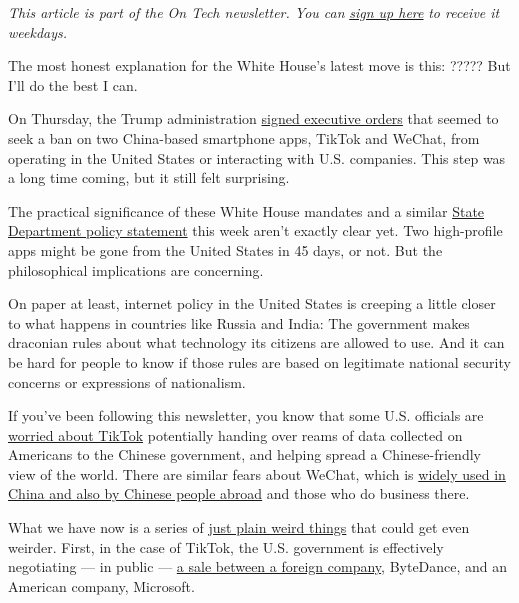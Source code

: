 \emph{This article is part of the On Tech newsletter. You can}
\href{https://www.nytimes.com/newsletters/signup/OT}{\emph{sign up
here}} \emph{to receive it weekdays.}

The most honest explanation for the White House's latest move is this:
????? But I'll do the best I can.

On Thursday, the Trump administration
\href{https://www.nytimes.com/2020/08/06/technology/trump-wechat-tiktok-china.html}{signed
executive orders} that seemed to seek a ban on two China-based
smartphone apps, TikTok and WeChat, from operating in the United States
or interacting with U.S. companies. This step was a long time coming,
but it still felt surprising.

The practical significance of these White House mandates and a similar
\href{https://www.state.gov/announcing-the-expansion-of-the-clean-network-to-safeguard-americas-assets/}{State
Department policy statement} this week aren't exactly clear yet. Two
high-profile apps might be gone from the United States in 45 days, or
not. But the philosophical implications are concerning.

On paper at least, internet policy in the United States is creeping a
little closer to what happens in countries like Russia and India: The
government makes draconian rules about what technology its citizens are
allowed to use. And it can be hard for people to know if those rules are
based on legitimate national security concerns or expressions of
nationalism.

If you've been following this newsletter, you know that some U.S.
officials are
\href{https://www.nytimes.com/2020/07/26/technology/tiktok-china-ban-model.html}{worried
about TikTok} potentially handing over reams of data collected on
Americans to the Chinese government, and helping spread a
Chinese-friendly view of the world. There are similar fears about
WeChat, which is
\href{https://www.nytimes.com/2020/08/07/business/trump-china-wechat-tiktok.html}{widely
used in China and also by Chinese people abroad} and those who do
business there.

What we have now is a series of
\href{https://www.nytimes.com/2020/08/03/technology/tiktok-microsoft.html}{just
plain weird things} that could get even weirder. First, in the case of
TikTok, the U.S. government is effectively negotiating --- in public ---
\href{https://www.nytimes.com/2020/08/03/technology/trump-tiktok-microsoft.html}{a
sale between a foreign company}, ByteDance, and an American company,
Microsoft.

